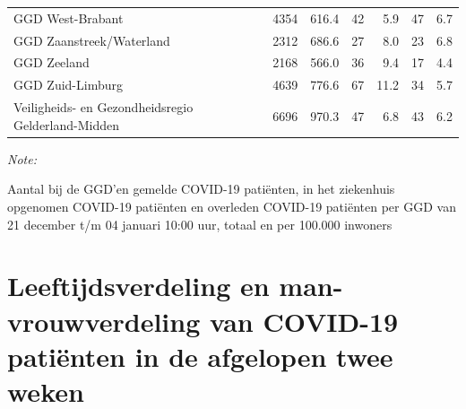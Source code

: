 \documentclass[
  english,
  man,floatsintext]{apa6}
\begin{document}
\begin{table}[H]
\begin{threeparttable}
\begin{tabular}{lrrrrrr}
GGD West-Brabant & 4354 & 616.4 & 42 & 5.9 & 47 & 6.7\\
GGD Zaanstreek/Waterland & 2312 & 686.6 & 27 & 8.0 & 23 & 6.8\\
GGD Zeeland & 2168 & 566.0 & 36 & 9.4 & 17 & 4.4\\
GGD Zuid-Limburg & 4639 & 776.6 & 67 & 11.2 & 34 & 5.7\\
Veiligheids- en Gezondheidsregio Gelderland-Midden & 6696 & 970.3 & 47 & 6.8 & 43 & 6.2\\
\bottomrule
\end{tabular}
\begin{tablenotes}
\item \textit{Note: } 
\item Aantal bij de GGD’en gemelde COVID-19 patiënten, in het ziekenhuis opgenomen COVID-19 patiënten en overleden COVID-19 patiënten per GGD van 21 december t/m 04 januari 10:00 uur, totaal en per 100.000 inwoners
\end{tablenotes}
\end{threeparttable}
\endgroup{}
\end{table}

\newpage

\hypertarget{leeftijdsverdeling-en-man-vrouwverdeling-van-covid-19-patiuxebnten-in-de-afgelopen-twee-weken}{%
\section{Leeftijdsverdeling en man-vrouwverdeling van COVID-19 patiënten in de afgelopen twee weken}\label{leeftijdsverdeling-en-man-vrouwverdeling-van-covid-19-patiuxebnten-in-de-afgelopen-twee-weken}}
\end{document}
